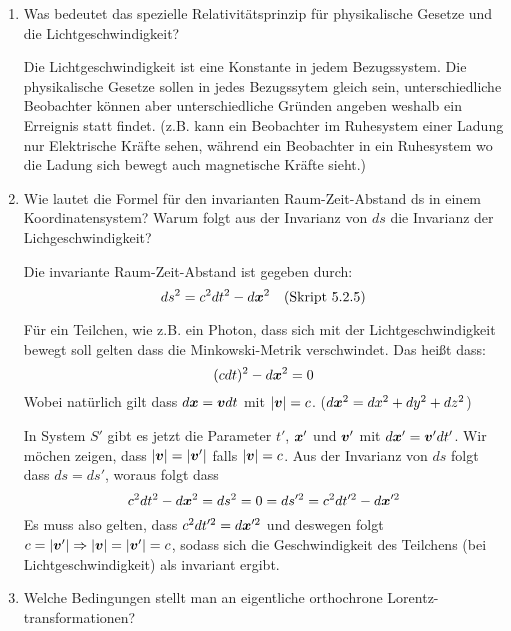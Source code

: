 \begin{enumerate}
  \item Was bedeutet das spezielle Relativitätsprinzip für physikalische %
    Gesetze und die Lichtgeschwindigkeit?

    Die Lichtgeschwindigkeit ist eine Konstante in jedem Bezugssystem.
    Die physikalische Gesetze sollen in jedes Bezugssytem gleich sein,
    unterschiedliche Beobachter können aber unterschiedliche Gründen
    angeben weshalb ein Erreignis statt findet. (z.B. kann ein Beobachter
    im Ruhesystem einer Ladung nur Elektrische Kräfte sehen, während
    ein Beobachter in ein Ruhesystem wo die Ladung sich bewegt auch
    magnetische Kräfte sieht.) 

  \item Wie lautet die Formel für den invarianten Raum-Zeit-Abstand ds in %
    einem Koordinatensystem? Warum folgt aus der Invarianz von $ds$ die
    Invarianz der Lichgeschwindigkeit?
    
    Die invariante Raum-Zeit-Abstand ist gegeben durch:
    \begin{equation*}
      ds^2 = c^2 dt^2 - d\vb* x^2
      \quad\text{(Skript 5.2.5)}
    \end{equation*}

      Für ein Teilchen, wie z.B. ein Photon, dass sich mit der 
      Lichtgeschwindigkeit bewegt soll gelten dass die Minkowski-Metrik
      verschwindet. Das heißt dass:
      \begin{equation*}
        (cdt)^2 - d\vb* x^2 = 0 
      \end{equation*}
      Wobei natürlich gilt dass $d\vb* x=\vb* vdt$ mit $\abs{\vb* v}=c$.
      ($d\vb* x^2 = dx^2 + dy^2 + dz^2$)

      In System $S'$ gibt es jetzt die Parameter $t'$, $\vb* x'$ und $\vb* v'$
      mit $d\vb* x'=\vb* v'dt'$. Wir möchen zeigen, dass 
      $\abs{\vb* v}=\abs{\vb* v'}$ falls $\abs{\vb* v}=c$.
      Aus der Invarianz von $ds$ folgt dass $ds=ds'$, woraus folgt dass
      \begin{equation*}
        c^2dt^2-d\vb* x^2 = ds^2 = 0 = ds'^2 = c^2dt'^2 - d\vb* x'^2
      \end{equation*}
      Es muss also gelten, dass $c^2dt'^2 = d\vb* x'^2$ und deswegen folgt
      $c=\abs{\vb* v'}\Rightarrow \abs{\vb* v}=\abs{\vb* v'}=c$, 
      sodass sich die Geschwindigkeit 
      des Teilchens (bei Lichtgeschwindigkeit) als invariant ergibt.

  \item Welche Bedingungen stellt man an eigentliche orthochrone %
    Lorentz-transformationen?


\end{enumerate}
